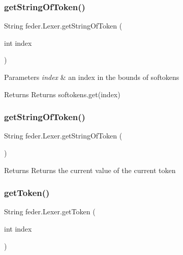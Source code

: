 \subsubsection{\texorpdfstring{get\+String\+Of\+Token()}{getStringOfToken()}\hspace{0.1cm}{\footnotesize\ttfamily [1/2]}}
{\footnotesize\ttfamily String feder.\+Lexer.\+get\+String\+Of\+Token (\begin{DoxyParamCaption}\item[{int}]{index }\end{DoxyParamCaption})}


\begin{DoxyParams}{Parameters}
{\em index} & an index in the bounds of softokens \\
\hline
\end{DoxyParams}
\begin{DoxyReturn}{Returns}
Returns softokens.\+get(index) 
\end{DoxyReturn}
\mbox{\label{classfeder_1_1Lexer_ad9de8a8d8a612b1fd99a1c8cdc327768}} 
\subsubsection{\texorpdfstring{get\+String\+Of\+Token()}{getStringOfToken()}\hspace{0.1cm}{\footnotesize\ttfamily [2/2]}}
{\footnotesize\ttfamily String feder.\+Lexer.\+get\+String\+Of\+Token (\begin{DoxyParamCaption}{ }\end{DoxyParamCaption})}

\begin{DoxyReturn}{Returns}
Returns the current value of the current token 
\end{DoxyReturn}
\mbox{\label{classfeder_1_1Lexer_a7d9ad2063076fe1ba3b005024537a629}} 
\subsubsection{\texorpdfstring{get\+Token()}{getToken()}\hspace{0.1cm}{\footnotesize\ttfamily [1/2]}}
{\footnotesize\ttfamily String feder.\+Lexer.\+get\+Token (\begin{DoxyParamCaption}\item[{int}]{index }\end{DoxyParamCaption})}

